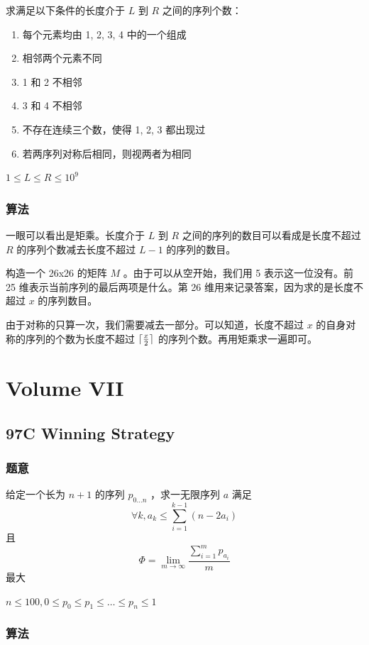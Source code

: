 \documentclass[11pt]{article}
\begin{document}
    求满足以下条件的长度介于 $L$ 到 $R$ 之间的序列个数：
\begin{enumerate}
\item 每个元素均由 1, 2, 3, 4 中的一个组成
\item 相邻两个元素不同
\item 1 和 2 不相邻
\item 3 和 4 不相邻
\item 不存在连续三个数，使得 1, 2, 3 都出现过
\item 若两序列对称后相同，则视两者为相同
\end{enumerate}

   $1 \leq L \leq R \leq 10^9$
\subsubsection{算法}
\label{sec-6-9-2}

    一眼可以看出是矩乘。长度介于 $L$ 到 $R$ 之间的序列的数目可以看成是长度不超过 $R$ 的序列个数减去长度不超过 $L - 1$ 的序列的数目。

    构造一个 26x26 的矩阵 $M$ 。由于可以从空开始，我们用 5 表示这一位没有。前 25 维表示当前序列的最后两项是什么。第 26 维用来记录答案，因为求的是长度不超过 $x$ 的序列数目。

    由于对称的只算一次，我们需要减去一部分。可以知道，长度不超过 $x$ 的自身对称的序列的个数为长度不超过 ${\lceil \frac{x}{2} \rceil}$ 的序列个数。再用矩乘求一遍即可。
\section{Volume VII}
\label{sec-7}
\subsection{97C   Winning Strategy}
\label{sec-7-1}
\subsubsection{题意}
\label{sec-7-1-1}

    给定一个长为 $n + 1$ 的序列 $p_{0 \dots n}$ ，求一无限序列 $a$ 满足
    $$\forall k, a_k \leq \sum_{i = 1}^{k - 1} (n - 2 a_i)$$
    且
    $$\Phi = \lim_{m \to \infty} \frac{\sum_{i = 1}^m p_{a_i}}{m}$$
    最大

    $n \leq 100, 0 \leq p_0 \leq p_1 \leq \dots \leq p_n \leq 1$ 
\subsubsection{算法}
\label{sec-7-1-2}
\end{document}
